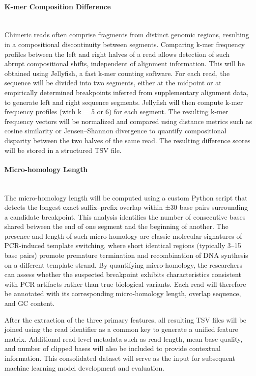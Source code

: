 \paragraph{K-mer Composition Difference}\hfill\\
Chimeric reads often comprise fragments from distinct genomic regions, resulting in a compositional discontinuity between segments. Comparing k-mer frequency profiles between the left and right halves of a read allows detection of such abrupt compositional shifts, independent of alignment information. This will be obtained using Jellyfish, a fast k-mer counting software. For each read, the sequence will be divided into two segments, either at the midpoint or at empirically determined breakpoints inferred from supplementary alignment data, to generate left and right sequence segments. Jellyfish will then compute k-mer frequency profiles (with k = 5 or 6) for each segment. The resulting k-mer frequency vectors will be normalized and compared using distance metrics such as cosine similarity or Jensen–Shannon divergence to quantify compositional disparity between the two halves of the same read. The resulting difference scores will be stored in a structured TSV file.

\paragraph{Micro-homology Length}\hfill\\
The micro-homology length will be computed using a custom Python script that detects the longest exact suffix–prefix overlap within ±30 base pairs surrounding a candidate breakpoint. This analysis identifies the number of consecutive bases shared between the end of one segment and the beginning of another. The presence and length of such micro-homology are classic molecular signatures of PCR-induced template switching, where short identical regions (typically 3–15 base pairs) promote premature termination and recombination of DNA synthesis on a different template strand. By quantifying micro-homology, the researchers can assess whether the suspected breakpoint exhibits characteristics consistent with PCR artifacts rather than true biological variants. Each read will therefore be annotated with its corresponding micro-homology length, overlap sequence, and GC content.

After the extraction of the three primary features, all resulting TSV files will be joined using the read identifier as a common key to generate a unified feature matrix. Additional read-level metadata such as read length, mean base quality, and number of clipped bases will also be included to provide contextual information. This consolidated dataset will serve as the input for subsequent machine learning model development and evaluation.


